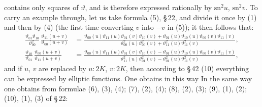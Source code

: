 contains only squares of $\vartheta$, and is therefore expressed rationally by $\mathrm{sn}^2 u$, $\mathrm{sn}^2 v$. To carry an example through, let us take formula (5), \S\,22, and divide it once by (1) and then by (4) (the first time converting $v$ into $-v$ in (5)); it then follows that:
\begin{align*}
\frac{\vartheta_{01}\vartheta_{10}}{\vartheta_{00}^2}\,\frac{\vartheta_{11}(u+v)}{\vartheta_{00}(u+v)} &= \frac{\vartheta_{00}(u)\vartheta_{11}(u)\vartheta_{01}(v)\vartheta_{10}(v) + \vartheta_{01}(u)\vartheta_{10}(u)\vartheta_{00}(v)\vartheta_{11}(v)}{\vartheta_{00}^2(u)\vartheta_{00}^2(v) + \vartheta_{11}^2(u)\vartheta_{11}^2(v)},\\
\frac{\vartheta_{10}}{\vartheta_{01}}\,\frac{\vartheta_{00}(u+v)}{\vartheta_{11}(u+v)} &= \frac{\vartheta_{00}(u)\vartheta_{11}(u)\vartheta_{01}(v)\vartheta_{10}(v) - \vartheta_{01}(u)\vartheta_{10}(u)\vartheta_{00}(v)\vartheta_{11}(v)}{\vartheta_{11}^2(u)\vartheta_{01}^2(v) - \vartheta_{01}^2(u)\vartheta_{11}^2(v)},
\end{align*}
and if $u$, $v$ are replaced by $u:2K$, $v:2K$, then according to \S\,42 (10) everything can be expressed by elliptic functions. One obtains in this way
In the same way one obtains from formulae (6), (3), (4); (7), (2), (4); (8), (2), (3); (9), (1), (2); (10), (1), (3) of \S\,22:
